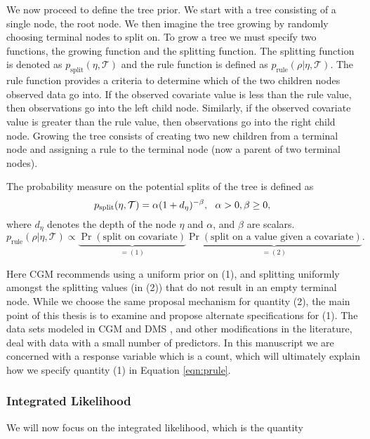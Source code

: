 \documentclass{article}
\begin{document}
We now proceed to define the tree prior. We start with a tree consisting of a single node, the root node. We then imagine the tree growing by randomly choosing terminal nodes to split on. To grow a tree we must specify two functions, the growing function and the splitting function.  The splitting function is denoted as $p_{\text{split}}(\eta, \mathcal{T})$ and the rule function is defined as $p_{\text{rule}}(\rho \vert \eta, \mathcal{T})$. The rule function provides a criteria to determine which of the two children nodes observed data go into. If the observed covariate value is less than the rule value, then observations go into the left child node. Similarly, if the observed covariate value is greater than the rule value, then observations go into the right child node. Growing the tree consists of creating two new children from a terminal node and assigning a rule to the terminal node (now a parent of two terminal nodes). 

The probability measure on the potential splits of the tree is defined as
\begin{equation}\label{eqn:psplit}
p_{\text{split}}(\eta, \mathcal{T})=\alpha(1+d_{\eta})^{-\beta}, \ \ \alpha>0, \beta\geq 0,\\
\end{equation}
where $d_{\eta}$ denotes the depth of the node $\eta$ and $\alpha$, and $\beta$ are scalars. 
\begin{equation}\label{eqn:prule}
p_{\text{rule}}(\rho \vert \eta, \mathcal{T}) \propto \underbrace{\Pr(\text{split on covariate})}_{=(1)}\underbrace{\Pr(\text{split on a value given a covariate})}_{=(2)}. 
\end{equation}

Here CGM recommends using a uniform prior on (1), and splitting uniformly amongst the splitting values (in (2)) that do not result in an empty terminal node. While we choose the same proposal mechanism for quantity (2), the main point of this thesis is to examine and propose alternate specifications for (1). The data sets modeled in CGM \cite{chipman1998bayesian} and DMS \cite{denison1998bayesian}, and other modifications in the literature, deal with data with a small number of predictors. In this manuscript we are concerned with a response variable which is a count, which will ultimately explain how we specify quantity (1) in Equation \ref{eqn:prule}. 

\subsubsection{Integrated Likelihood}
We will now focus on the integrated likelihood, which is the quantity 
\end{document}
